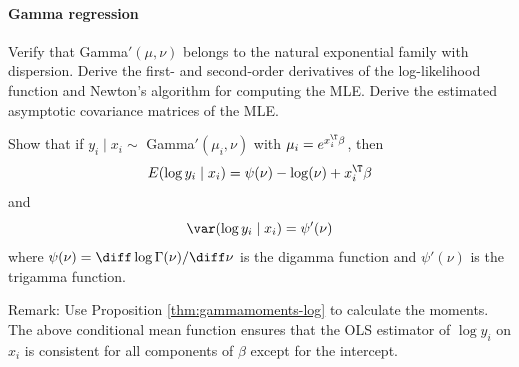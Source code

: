 \paragraph{Gamma regression}
\label{hw20::gamma-regression}

Verify that Gamma$'(\mu, \nu)$ belongs to the natural exponential family with dispersion. Derive the first- and second-order derivatives of the log-likelihood function and Newton's algorithm for computing the MLE. 
Derive the estimated asymptotic covariance matrices of the MLE. 


Show that if $y_i \mid x_i \sim $ Gamma$'(\mu_i, \nu)$ with $\mu_i = e^{x_i^{\T} \beta}$, then
$$
E(\log y_i \mid x_i ) = \psi(\nu) - \log (\nu) + x_i^{\T} \beta
$$
and
$$
\var(\log y_i \mid x_i ) = \psi'(\nu)
$$
where $\psi(\nu) = \diff \log  \Gamma  (\nu) / \diff \nu$ is the digamma function and $\psi'(\nu)$ is the trigamma function. 



Remark: Use Proposition \ref{thm:gammamoments-log} to calculate the moments.  The above conditional mean function ensures that the OLS estimator of $\log y_i$ on $x_i$ is consistent for all components of $\beta$ except for the intercept. 




 
